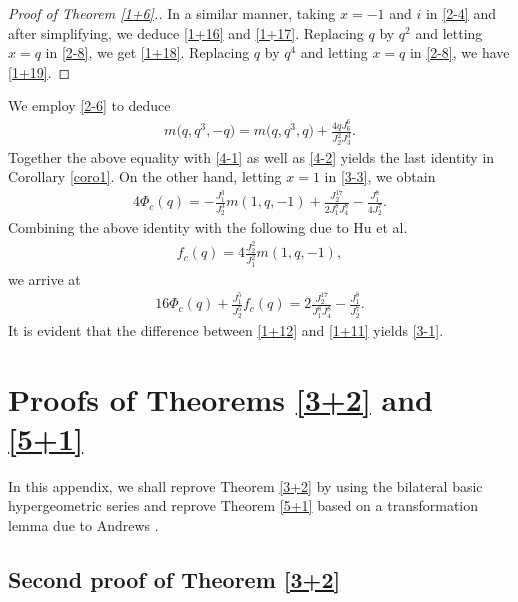 \documentclass[10pt,a4paper]{amsart}
\numberwithin{equation}{section}
\begin{document}
\begin{proof}[Proof of Theorem \ref{1+6}.]
In a similar manner, taking $x=-1$ and $i$ in \eqref{2-4} and after simplifying, we deduce \eqref{1+16} and \eqref{1+17}.
Replacing $q$ by $q^2$ and letting $x=q$ in \eqref{2-8}, we get \eqref{1+18}. Replacing $q$ by $q^4$ and letting $x=q$ in \eqref{2-8}, we have \eqref{1+19}.
\end{proof}

\begin{Remark}
We employ \eqref{2-6} to deduce
\begin{align*}
m\bigl(q,q^3,-q\bigr)=m\bigl(q,q^3,q\bigr)+\frac{4qJ_6^6}{J_2^2J_3^3}.
\end{align*}
Together the above equality with \eqref{4-1} as well as \eqref{4-2} yields the last identity in Corollary \ref{coro1}.
On the other hand, letting $x=1$ in \eqref{3-3}, we obtain
\begin{align*}
4\varPhi_c(q)=-\frac{J_1^3}{J_2^3}m(1,q,-1)+\frac{J_2^{17}}{2J_1^8J_4^8}
-\frac{J_1^8}{4J_2^7}.
\end{align*}
Combining the above identity with the following due to Hu et al.~\cite{HSZ}
\begin{align*}%
f_c(q)=4\frac{J_2^2}{J_1^2}m(1,q,-1),
\end{align*}
we arrive at
\begin{align}\label{1+11}
16\varPhi_c(q)+\frac{J_1^5}{J_2^5}f_c(q)=2\frac{J_2^{17}}{J_1^8J_4^8}
-\frac{J_1^8}{J_2^7}.
\end{align}
It is evident that the difference between \eqref{1+12} and \eqref{1+11} yields \eqref{3-1}.
\end{Remark}

\appendix

\section[Proofs of Theorems 2.3 and 2.6]{Proofs of Theorems \ref{3+2} and \ref{5+1}}\label{appendixA}


In this appendix, we shall reprove Theorem \ref{3+2} by using the bilateral basic hypergeometric series and reprove Theorem \ref{5+1} based on a transformation lemma due to Andrews \cite{A}.

\subsection[Second proof of Theorem 2.3]{Second proof of Theorem \ref{3+2}} \label{sec2}
\end{document}
